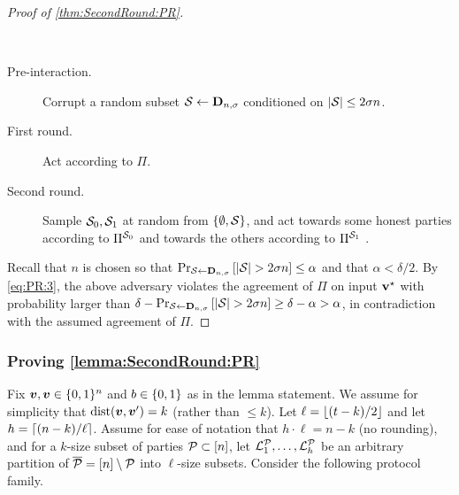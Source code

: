 \begin{proof}[Proof of \cref{thm:SecondRound:PR}]
{	\begin{algorithm}[$\Ac$]~
		
		\begin{description}
			\item[Pre-interaction.]
			Corrupt a random subset $\mathcal{S} \gets \mathbf{D}_{n,\sigma} $ conditioned on $\left|{\cal{S}}\right| \le 2\sigma n$.
			
			
			\item[First round.] Act according to $\Pi$.
			\item[Second round.] Sample ${\cal{S}}_0,{\cal{S}}_1$ at random from $\left\{\emptyset,{\cal{S}}\right\}$, and act towards some honest parties according to $\Pi^{{\cal{S}}_0}$ and towards the others according to $\Pi^{{\cal{S}}_1}$ .
		\end{description}
	\end{algorithm}
}
Recall that $n$ is chosen so that $\Pr_{{\cal{S}} \gets \mathbf{D}_{n,\sigma}}\left[\left|{\cal{S}}\right| >2\sigma n\right] \leq \alpha$ and that $\alpha < \delta/2$.
By \cref{eq:PR:3}, the above adversary violates the agreement of $\Pi$ on input $\mathbf{v}^{\star}$ with probability larger than $\delta - \Pr_{{\cal{S}} \gets \mathbf{D}_{n,\sigma}}\left[\left|{\cal{S}}\right| >2\sigma n\right] \ge \delta - \alpha >\alpha$, in contradiction with the assumed agreement of $\Pi$.
\end{proof}


\newcommand{\VV}{\cV^{\cP}}
\renewcommand{\PP}{\Pi^{\cP,\cS}}
\newcommand{\ops}{{\overline{\cP \cup \cS}}}

\subsubsection{Proving \cref{lemma:SecondRound:PR}}\label{sec:lemma:SecondRound:PR}
Fix ${ \boldsymbol{v}},{ \boldsymbol{v}} \in {\{0,1\}^n}$ and $b\in \{0,1\}$ as in the lemma statement. We assume for simplicity that $\mathrm{dist}({ \boldsymbol{v}},{ \boldsymbol{v}}')=k$ (rather than $\le k$).
Let $\ell= \left \lfloor(t -k)/2 \right \rfloor$ and let $h = \left\lceil (n-k)/\ell \right\rceil$. Assume for ease of notation that $h\cdot \ell = n-k $ (\ie no rounding), and for a $k$-size subset of parties $\mathcal{P} \subset [n]$, let $ {\cal{L}}^{\mathcal{P}}_1,\dots,{\cal{L}}_h^{\mathcal{P}}$ be an arbitrary partition of ${\overline{\mathcal{P}}} = [n] \setminus \mathcal{P}$ into $\ell$-size subsets. Consider the following protocol family.


